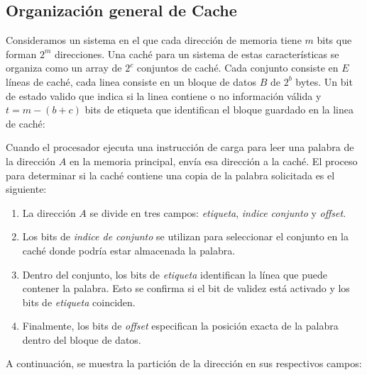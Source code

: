 \subsection{Organización general de Cache}
Consideramos un sistema en el que cada dirección de memoria tiene $m$ bits que forman
$2^m$ direcciones. Una caché para un sistema de estas características se organiza como un
array de $2^c$ conjuntos de caché. Cada conjunto consiste en $E$ líneas de caché, cada linea
consiste en un bloque de datos $B$ de $2^b$ bytes. Un bit de estado valido que indica si la linea contiene o
no información válida y $t = m - (b + c)$ bits de etiqueta que identifican el bloque guardado en la linea de caché:
\begin{center}
    
\end{center}
Cuando el procesador ejecuta una instrucción de carga para leer una palabra de la dirección $A$ en la memoria principal, envía esa dirección a la caché. El proceso para determinar si la caché contiene una copia de la palabra solicitada es el siguiente:
\begin{enumerate}
 
\item La dirección $A$ se divide en tres campos: \textit{etiqueta}, \textit{indice conjunto} y \textit{offset}.
\item Los bits de \textit{indice de conjunto} se utilizan para seleccionar el conjunto en la caché donde podría estar almacenada la palabra.
\item Dentro del conjunto, los bits de \textit{etiqueta} identifican la línea que puede contener la palabra. Esto se confirma si el bit de validez está activado y los bits de \textit{etiqueta} coinciden.
\item Finalmente, los bits de \textit{offset} especifican la posición exacta de la palabra dentro del bloque de datos.
\end{enumerate}

A continuación, se muestra la partición de la dirección en sus respectivos campos:

